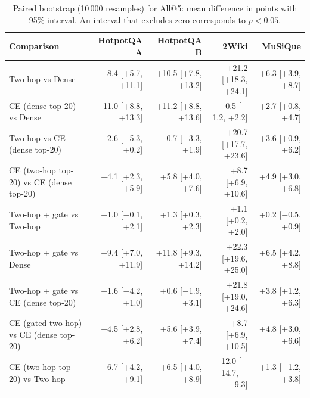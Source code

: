 \begin{table}[t]
\centering
\scriptsize
\setlength{\tabcolsep}{3pt}
\caption{Paired bootstrap (10\,000 resamples) for All@5: mean difference in points with 95\% interval. An interval that excludes zero corresponds to $p<0.05$.}
\label{tab:extsig}
\begin{tabular}{lrrrr}
\toprule
Comparison & HotpotQA A & HotpotQA B & 2Wiki & MuSiQue \\
\midrule
Two-hop vs Dense & +8.4 [+5.7, +11.1] & +10.5 [+7.8, +13.2] & +21.2 [+18.3, +24.1] & +6.3 [+3.9, +8.7] \\
CE (dense top-20) vs Dense & +11.0 [+8.8, +13.3] & +11.2 [+8.8, +13.6] & +0.5 [$-$1.2, +2.2] & +2.7 [+0.8, +4.7] \\
Two-hop vs CE (dense top-20) & $-$2.6 [$-$5.3, +0.2] & $-$0.7 [$-$3.3, +1.9] & +20.7 [+17.7, +23.6] & +3.6 [+0.9, +6.2] \\
CE (two-hop top-20) vs CE (dense top-20) & +4.1 [+2.3, +5.9] & +5.8 [+4.0, +7.6] & +8.7 [+6.9, +10.6] & +4.9 [+3.0, +6.8] \\
Two-hop + gate vs Two-hop & +1.0 [$-$0.1, +2.1] & +1.3 [+0.3, +2.3] & +1.1 [+0.2, +2.0] & +0.2 [$-$0.5, +0.9] \\
Two-hop + gate vs Dense & +9.4 [+7.0, +11.9] & +11.8 [+9.3, +14.2] & +22.3 [+19.6, +25.0] & +6.5 [+4.2, +8.8] \\
Two-hop + gate vs CE (dense top-20) & $-$1.6 [$-$4.2, +1.0] & +0.6 [$-$1.9, +3.1] & +21.8 [+19.0, +24.6] & +3.8 [+1.2, +6.3] \\
CE (gated two-hop) vs CE (dense top-20) & +4.5 [+2.8, +6.2] & +5.6 [+3.9, +7.4] & +8.7 [+6.9, +10.5] & +4.8 [+3.0, +6.6] \\
CE (two-hop top-20) vs Two-hop & +6.7 [+4.2, +9.1] & +6.5 [+4.0, +8.9] & $-$12.0 [$-$14.7, $-$9.3] & +1.3 [$-$1.2, +3.8] \\
\bottomrule
\end{tabular}
\end{table}